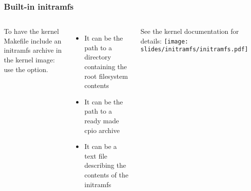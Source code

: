 \begin{frame}
  \frametitle{Built-in initramfs}
  \begin{columns}
  To have the kernel Makefile include an initramfs archive in
  the kernel image: use the 
  option.
  \begin{itemize}
  \item It can be the path to a directory containing the root
    filesystem contents
  \item It can be the path to a ready made cpio archive
  \item It can be a text file describing the contents of the initramfs
  \end{itemize}
  See the kernel documentation for details:
    \texttt{[image: slides/initramfs/initramfs.pdf]}
  \end{columns}
\end{frame}

